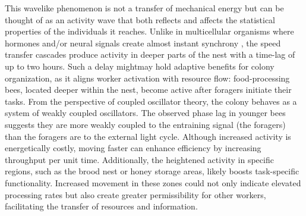 \documentclass{article}
\newcommand{\added}[1]{{\color{blue}#1}}
\newcommand{\deleted}[1]{{\color{red}#1}} %
\newcommand{\replaced}[2]{\deleted{#1}\added{#2}}
\newcommand{\added}[1]{#1}
\newcommand{\deleted}[1]{}
\newcommand{\replaced}[2]{#2}
\begin{document}
This wavelike phenomenon is not a transfer of mechanical energy but can be thought of as an activity wave that both reflects and affects the statistical properties of the individuals it reaches. Unlike in multicellular organisms where hormones and/or neural signals create almost instant synchrony \cite{finger_coupled_2020}, the speed transfer cascades produce activity in deeper parts of the nest with a time-lag of up to two hours. Such a delay \replaced{might}{may} hold adaptive benefits for colony organization, as it aligns worker activation with resource flow: food-processing bees, located deeper within the nest, become active after foragers initiate their tasks. \added{From the perspective of coupled oscillator theory, the colony behaves as a system of weakly coupled oscillators. The observed phase lag in younger bees suggests they are more weakly coupled to the entraining signal (the foragers) than the foragers are to the external light cycle.}
Although increased activity is energetically costly, moving faster can enhance efficiency by increasing throughput per unit time. Additionally, the heightened activity in specific regions, such as the brood nest or honey storage areas, likely boosts task-specific functionality. Increased movement in these zones could not only indicate elevated processing rates but also create greater permissibility for other workers, facilitating the transfer of resources and information.


 
\end{document}
